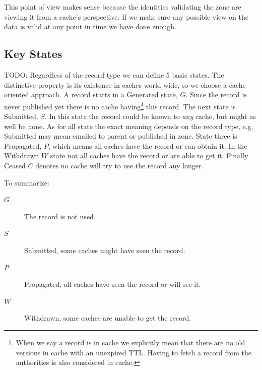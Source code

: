 \documentclass[twoside,english]{paper}
\begin{document}
This point of view makes sense because the identities validating the 
zone are viewing it from a cache's perspective. If we make sure any 
possible view on the data is valid at any point in time we have done 
enough.



\subsection{Key States}

TODO:
Regardless of the record type we can define 5 basic states. The 
distinctive property is its existence in caches world wide, so we 
choose a cache oriented approach. A record 
starts in a Generated state, $G$. Since the record is never 
published yet there is no cache having\footnote{When we say a record 
is in cache we explicitly mean that there are no old versions in 
cache with an unexpired TTL. Having to fetch a record from the 
authorities is also considered in cache.} this record. The next state is 
Submitted, $S$. In this state the record could be known to \emph
{any} cache, but might as well be none. As for all state the exact 
meaning depends on the record type, e.g. Submitted may mean emailed 
to parent or published in zone. State three is Propagated, $P$, 
which means all caches have the record or can obtain it. In the 
Withdrawn $W$ state not all caches have the record or are able to 
get it. Finally Ceased $C$ denotes no cache will try to use the 
record any longer.

To summarize:

\begin{description}
       \item[$G$] The record is not used.
       \item[$S$] Submitted, some caches might have seen the record.
       \item[$P$] Propagated, all caches have seen the record or will see it.
       \item[$W$] Withdrawn, some caches are unable to get the record.
\end{description} 


\end{document}
